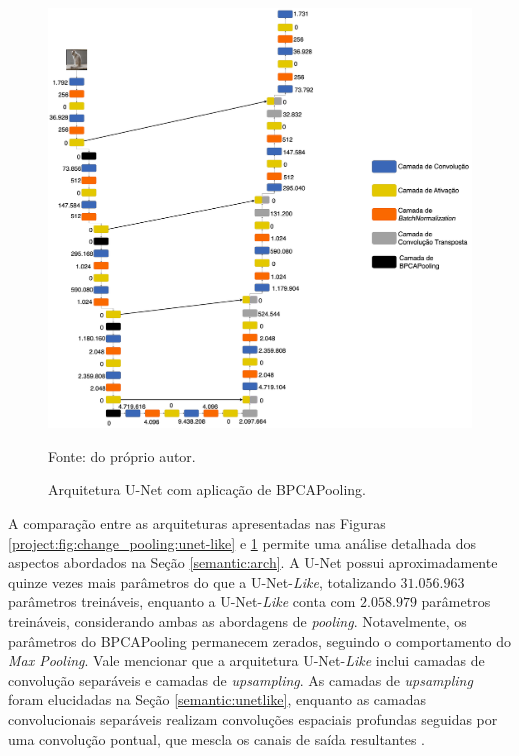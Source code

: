 \begin{figure}[H]
    \centering
    \caption{Arquitetura U-Net com aplicação de BPCAPooling.}
    \includegraphics[width=1\textwidth]{recursos/imagens/project/unet-with-bpca.png}
    \label{project:fig:change_pooling:unet}

    Fonte: do próprio autor.
\end{figure}

A comparação entre as arquiteturas apresentadas nas Figuras \ref{project:fig:change_pooling:unet-like} e \ref{project:fig:change_pooling:unet} permite uma análise detalhada dos aspectos abordados na Seção \ref{semantic:arch}. A U-Net possui aproximadamente quinze vezes mais parâmetros do que a U-Net-\textit{Like}, totalizando $31.056.963$ parâmetros treináveis, enquanto a U-Net-\textit{Like} conta com $2.058.979$ parâmetros treináveis, considerando ambas as abordagens de \textit{pooling}. Notavelmente, os parâmetros do BPCAPooling permanecem zerados, seguindo o comportamento do \textit{Max Pooling}. Vale mencionar que a arquitetura U-Net-\textit{Like} inclui camadas de convolução separáveis e camadas de \textit{upsampling}. As camadas de \textit{upsampling} foram elucidadas na Seção \ref{semantic:unetlike}, enquanto as camadas convolucionais separáveis realizam convoluções espaciais profundas seguidas por uma convolução pontual, que mescla os canais de saída resultantes \citep{Zhao2018AutomaticFPGA}.


